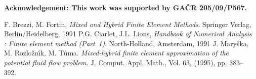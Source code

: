 \documentclass{elsart}
\begin{document}
{\bf Acknowledgement: This work was supported by GA\v CR 205/09/P567.}

\begin{thebibliography}{99}
 F. Brezzi, M. Fortin,
{\it Mixed and Hybrid Finite Element Methods}.
Springer Verlag, Berlin/Heidelberg, 1991
 P.G. Ciarlet, J.L. Lions,
{\it Handbook of Numerical Analysis : Finite element method (Part~1)}.
 North-Holland, Amsterdam, 1991
 J. Mary\v{s}ka,  M. Rozlo\v{z}n\'{\i}k, M. T\r{u}ma.
{\it Mixed-hybrid finite element approximation  of the potential fluid flow problem}.
J. Comput. Appl. Math., Vol. 63, (1995), pp. 383--392.

\end{thebibliography}
\end{document}
